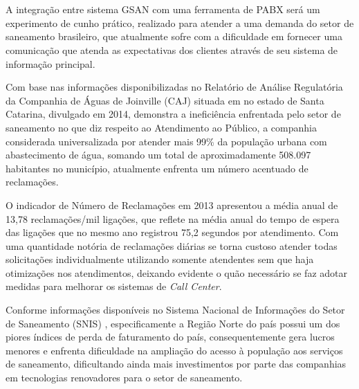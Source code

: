 \section*{\fontsize{12}{1} }
A integração entre sistema GSAN com uma ferramenta de PABX será um experimento de cunho prático, realizado para atender a uma demanda do setor de saneamento brasileiro, que atualmente sofre com a dificuldade em fornecer uma comunicação que atenda as expectativas dos clientes através de seu sistema de informação principal.

Com base nas informações disponibilizadas no Relatório de Análise Regulatória da Companhia de Águas de Joinville (CAJ) \cite{AMAE2014} 
situada em no estado de Santa Catarina, divulgado em 2014, demonstra a ineficiência enfrentada pelo setor de saneamento no que diz respeito ao Atendimento ao Público, a companhia considerada universalizada por atender mais 99\% da população urbana com abastecimento de água, somando um total de aproximadamente 508.097 habitantes no município, atualmente enfrenta um número acentuado de reclamações.




 O indicador de Número de Reclamações em 2013 apresentou a média anual de 13,78 reclamações/mil ligações, que reflete na média anual do tempo de espera das ligações que no mesmo ano registrou 75,2 segundos por atendimento. Com uma quantidade notória de reclamações diárias se torna custoso atender todas solicitações individualmente utilizando somente atendentes sem que haja otimizações nos atendimentos,   deixando evidente o quão necessário se faz adotar medidas para melhorar os sistemas de \textit{Call Center}. 
 
 Conforme informações disponíveis no Sistema Nacional de Informações do Setor de Saneamento (SNIS) \cite{SNIS:2014}, especificamente a Região Norte do país possui um dos piores índices de perda de faturamento do país, consequentemente gera lucros menores e enfrenta dificuldade na ampliação do acesso à população aos serviços de saneamento, dificultando ainda mais investimentos por parte das companhias em tecnologias renovadores para o setor de saneamento.
 
